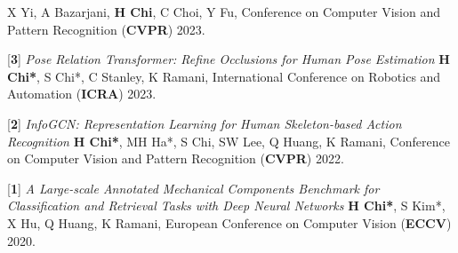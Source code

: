 \begin{cventries}
{\begin{cvitems}
{        \hspace{1. em} X Yi, A Bazarjani, \textbf{H Chi}, C Choi, Y Fu,
        Conference on Computer Vision and Pattern Recognition (\textbf{CVPR}) 2023.}
    \item {[\textbf{3}] \textit{Pose Relation Transformer: Refine Occlusions for Human Pose Estimation} \newline
        \hspace{1. em}\textbf{H Chi*}, S Chi*, C Stanley, K Ramani,
        International Conference on Robotics and Automation (\textbf{ICRA}) 2023.}
    \item {[\textbf{2}] \textit{InfoGCN: Representation Learning for Human Skeleton-based Action Recognition} \newline
        \hspace{1. em}\textbf{H Chi*}, MH Ha*, S Chi, SW Lee, Q Huang, K Ramani, 
        Conference on Computer Vision and Pattern Recognition (\textbf{CVPR}) 2022.}
    \item {[\textbf{1}] \textit{A Large-scale Annotated Mechanical Components Benchmark for Classification and Retrieval Tasks with Deep Neural Networks} \newline
        \hspace{1. em}\textbf{H Chi*}, S Kim*, X Hu, Q Huang, K Ramani,
        European Conference on Computer Vision (\textbf{ECCV}) 2020.}
\end{cvitems}
}



\end{cventries}

